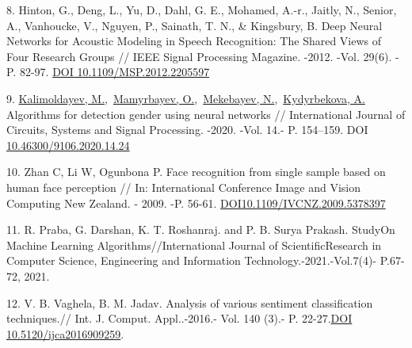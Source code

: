 \begin{references}
8. Hinton, G., Deng, L., Yu, D., Dahl, G. E., Mohamed, A.-r., Jaitly, N.,
Senior, A., Vanhoucke, V., Nguyen, P., Sainath, T. N., \& Kingsbury,
B. Deep Neural Networks for Acoustic Modeling in Speech Recognition:
The Shared Views of Four Research Groups // IEEE Signal Processing
Magazine. -2012. -Vol. 29(6). -P. 82-97.
\href{https://doi.org/10.1109/MSP.2012.2205597}{DOI
10.1109/MSP.2012.2205597}

9. \href{https://www.scopus.com/authid/detail.uri?authorId=56153126500}{Kalimoldayev,
M.},~\href{https://www.scopus.com/authid/detail.uri?authorId=55967630400}{Mamyrbayev,
O.},~\href{https://www.scopus.com/authid/detail.uri?authorId=57202316868}{Mekebayev,
N.},~\href{https://www.scopus.com/authid/detail.uri?authorId=57208346238}{Kydyrbekova,
A.} Algorithms for detection gender using neural networks //
International Journal of Circuits, Systems and Signal
Processing. -2020. -Vol. 14.- P. 154--159. DOI
\href{https://doi.org/10.46300/9106.2020.14.24}{10.46300/9106.2020.14.24}

10. Zhan C, Li W, Ogunbona P. Face recognition from single sample based on
human face perception // In: International Conference Image and Vision
Computing New Zealand. - 2009. -P. 56-61.
\href{https://doi.org/10.1109/IVCNZ.2009.5378397}{DOI10.1109/IVCNZ.2009.5378397}

11. R. Praba, G. Darshan, K. T. Roshanraj. and P. B. Surya Prakash.
StudyOn Machine Learning Algorithms//International Journal of
ScientificResearch in Computer Science, Engineering and Information
Technology.-2021.-Vol.7(4)- P.67-72, 2021.

12. V. B. Vaghela, B. M. Jadav. Analysis of various sentiment
classification techniques.// Int. J. Comput. Appl..-2016.- Vol. 140
(3).- P. 22-27.\href{https://doi.org/10.5120/ijca2016909259}{DOI
10.5120/ijca2016909259}.
\end{references}

